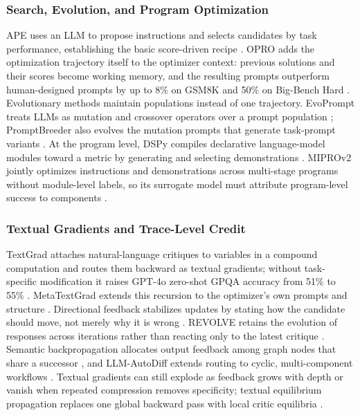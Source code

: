 \subsubsection{Search, Evolution, and Program Optimization}
\label{supp:optimizer-search-evolution}

APE uses an LLM to propose instructions and selects candidates by task performance, establishing the basic score-driven recipe \citep{zhou2023ape}. OPRO adds the optimization trajectory itself to the optimizer context: previous solutions and their scores become working memory, and the resulting prompts outperform human-designed prompts by up to 8\% on GSM8K and 50\% on Big-Bench Hard \citep{yang2024opro}. Evolutionary methods maintain populations instead of one trajectory. EvoPrompt treats LLMs as mutation and crossover operators over a prompt population \citep{guo2024evoprompt}; PromptBreeder also evolves the mutation prompts that generate task-prompt variants \citep{fernando2023promptbreeder}. At the program level, DSPy compiles declarative language-model modules toward a metric by generating and selecting demonstrations \citep{khattab2023dspy}. MIPROv2 jointly optimizes instructions and demonstrations across multi-stage programs without module-level labels, so its surrogate model must attribute program-level success to components \citep{opsahlong2024mipro}.

\subsubsection{Textual Gradients and Trace-Level Credit}
\label{supp:optimizer-textual-gradients}

TextGrad attaches natural-language critiques to variables in a compound computation and routes them backward as textual gradients; without task-specific modification it raises GPT-4o zero-shot GPQA accuracy from 51\% to 55\% \citep{yuksekgonul2024textgrad}. MetaTextGrad extends this recursion to the optimizer's own prompts and structure \citep{xu2025metatextgrad}. Directional feedback stabilizes updates by stating how the candidate should move, not merely why it is wrong \citep{nie2024importance}. REVOLVE retains the evolution of responses across iterations rather than reacting only to the latest critique \citep{zhang2024revolve}. Semantic backpropagation allocates output feedback among graph nodes that share a successor \citep{wang2024how}, and LLM-AutoDiff extends routing to cyclic, multi-component workflows \citep{yin2025llmautodiff}. Textual gradients can still explode as feedback grows with depth or vanish when repeated compression removes specificity; textual equilibrium propagation replaces one global backward pass with local critic equilibria \citep{chen2026textual}.

